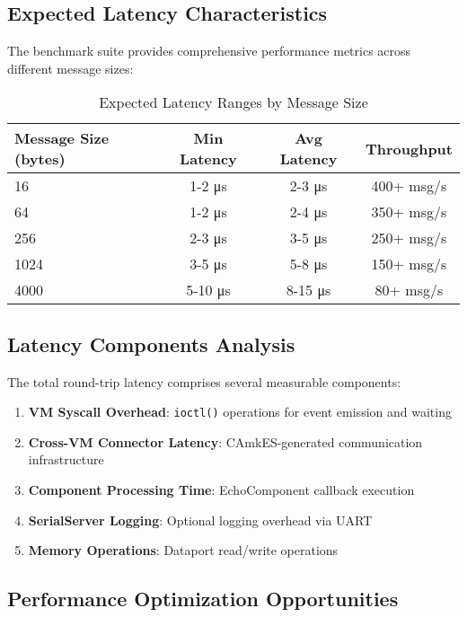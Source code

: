 \documentclass[12pt,a4paper]{article}
\begin{document}
\subsection{Expected Latency Characteristics}

The benchmark suite provides comprehensive performance metrics across different message sizes:

\begin{table}[htbp]
\centering
\caption{Expected Latency Ranges by Message Size}
\label{tab:latency}
\begin{tabular}{@{}lccc@{}}
\toprule
Message Size (bytes) & Min Latency & Avg Latency & Throughput \\
\midrule
16  & 1-2 μs & 2-3 μs & 400+ msg/s \\
64  & 1-2 μs & 2-4 μs & 350+ msg/s \\
256 & 2-3 μs & 3-5 μs & 250+ msg/s \\
1024 & 3-5 μs & 5-8 μs & 150+ msg/s \\
4000 & 5-10 μs & 8-15 μs & 80+ msg/s \\
\bottomrule
\end{tabular}
\end{table}

\subsection{Latency Components Analysis}

The total round-trip latency comprises several measurable components:

\begin{enumerate}
\item \textbf{VM Syscall Overhead}: \texttt{ioctl()} operations for event emission and waiting
\item \textbf{Cross-VM Connector Latency}: CAmkES-generated communication infrastructure
\item \textbf{Component Processing Time}: EchoComponent callback execution
\item \textbf{SerialServer Logging}: Optional logging overhead via UART
\item \textbf{Memory Operations}: Dataport read/write operations
\end{enumerate}

\subsection{Performance Optimization Opportunities}
\end{document}
